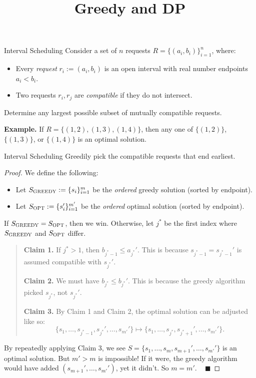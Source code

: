 \title{Greedy and DP}



\begin{problem}{Interval Scheduling}
Consider a set of $n$ requests $R = \{(a_i, b_i)\}_{i = 1}^n$, where:
\begin{itemize}
    \item Every \emph{request} $r_i := (a_i, b_i)$ is an open interval with real number endpoints $a_i< b_i$.
    \item Two requests $r_i, r_j$ are \emph{compatible} if they do not intersect.
\end{itemize}
Determine any largest possible subset of mutually compatible requests.
\end{problem}

\textbf{Example.} If $R = \{(1, 2), (1, 3), (1, 4)\}$, then any one of $\{(1, 2)\}$, $\{(1, 3)\}$, or $\{(1, 4)\}$ is an optimal solution.

\begin{solution}{Interval Scheduling}
Greedily pick the compatible requests that end earliest.
\end{solution}

\begin{proof}
We define the following:
\begin{itemize}
    \item Let $S_{\textsc{GREEDY}} := \{s_i\}_{i = 1}^m$ be the \emph{ordered} greedy solution (sorted by endpoint).
    \item Let $S_{\textsc{OPT}} := \{s_i'\}_{i = 1}^{m'}$ be the \emph{ordered} optimal solution (sorted by endpoint).
\end{itemize}
If $S_{\textsc{GREEDY}} = S_{\textsc{OPT}}$, then we win.  Otherwise, let $j^*$ be the first index where $S_{\textsc{GREEDY}}$ and $S_{\textsc{OPT}}$ differ.
\begin{quote}
    \textbf{Claim 1.} If $j^* > 1$, then $b_{j^* - 1} \leq a_{j^*}'$.  This is because $s_{j^* - 1} = s_{j^* - 1}'$ is assumed compatible with $s_{j^*}'$.

    \textbf{Claim 2.} We must have $b_{j^*} \leq b_{j^*}'$.  This is because the greedy algorithm picked $s_{j^*}$, not $s_{j^*}'$.

    \textbf{Claim 3.} By Claim 1 and Claim 2, the optimal solution can be adjusted like so:
    \[ \{s_1, \dots, s_{j^* - 1}, s_{j^*}', \dots, s_{m'}'\} \mapsto \{s_1, \dots, s_{j^*}, s_{j^* + 1}', \dots, s_{m'}'\}. \]
\end{quote}
By repeatedly applying Claim 3, we see $S = \{s_1, \dots, s_m, s_{m + 1}', \dots, s_{m'}'\}$ is an optimal solution.  But $m' > m$ is impossible!  If it were, the greedy algorithm would have added $(s_{m + 1}', \dots, s_{m'}')$, yet it didn't.  So $m = m'$. ~ $\blacksquare$
\end{proof}

